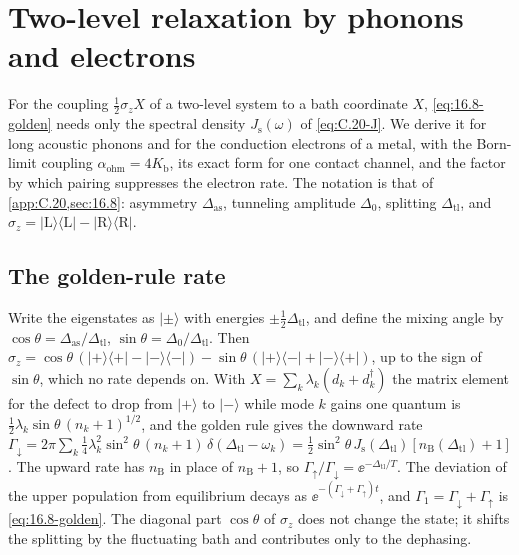 \section{Two-level relaxation by phonons and electrons}\label{app:D.42}

For the coupling $\tfrac12\sigma_z X$ of a two-level system to a bath coordinate $X$, \cref{eq:16.8-golden} needs only the spectral density $J_{\mathrm{s}}(\omega)$ of \cref{eq:C.20-J}. We derive it for long acoustic phonons and for the conduction electrons of a metal, with the Born-limit coupling $\alpha_{\mathrm{ohm}} = 4K_{\mathrm{b}}$, its exact form for one contact channel, and the factor by which pairing suppresses the electron rate. The notation is that of \cref{app:C.20,sec:16.8}: asymmetry $\Delta_{\mathrm{as}}$, tunneling amplitude $\Delta_0$, splitting $\Delta_{\mathrm{tl}}$, and $\sigma_z = |\mathrm{L}\rangle\langle\mathrm{L}| - |\mathrm{R}\rangle\langle\mathrm{R}|$.

\subsection*{The golden-rule rate}

Write the eigenstates as $|{\pm}\rangle$ with energies $\pm\tfrac12\Delta_{\mathrm{tl}}$, and define the mixing angle by $\cos\theta = \Delta_{\mathrm{as}}/\Delta_{\mathrm{tl}}$, $\sin\theta = \Delta_0/\Delta_{\mathrm{tl}}$. Then $\sigma_z = \cos\theta\,(|{+}\rangle\langle{+}| - |{-}\rangle\langle{-}|) - \sin\theta\,(|{+}\rangle\langle{-}| + |{-}\rangle\langle{+}|)$, up to the sign of $\sin\theta$, which no rate depends on. With $X = \sum_k\lambda_k(d_k + d_k^\dagger)$ the matrix element for the defect to drop from $|{+}\rangle$ to $|{-}\rangle$ while mode $k$ gains one quantum is $\tfrac12\lambda_k\sin\theta\,(n_k + 1)^{1/2}$, and the golden rule gives the downward rate $\varGamma_\downarrow = 2\pi\sum_k\tfrac14\lambda_k^2\sin^2\theta\,(n_k + 1)\,\delta(\Delta_{\mathrm{tl}} - \omega_k) = \tfrac12\sin^2\theta\,J_{\mathrm{s}}(\Delta_{\mathrm{tl}})[n_{\mathrm{B}}(\Delta_{\mathrm{tl}}) + 1]$. The upward rate has $n_{\mathrm{B}}$ in place of $n_{\mathrm{B}} + 1$, so $\varGamma_\uparrow/\varGamma_\downarrow = \ee^{-\Delta_{\mathrm{tl}}/T}$. The deviation of the upper population from equilibrium decays as $\ee^{-(\varGamma_\downarrow + \varGamma_\uparrow)t}$, and $\varGamma_1 = \varGamma_\downarrow + \varGamma_\uparrow$ is \cref{eq:16.8-golden}. The diagonal part $\cos\theta$ of $\sigma_z$ does not change the state; it shifts the splitting by the fluctuating bath and contributes only to the dephasing.

